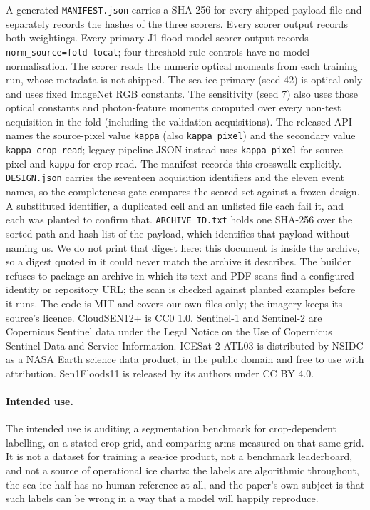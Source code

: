 \documentclass[10pt,twocolumn,letterpaper]{article}
\begin{document}
A generated \texttt{MANIFEST.json} carries a SHA-256 for every shipped payload file
and separately records the hashes of the three scorers. Every scorer output records
both weightings. Every primary J1 flood model-scorer output records
\texttt{norm\_source=fold-local}; four threshold-rule controls have no model
normalisation. The scorer reads the numeric optical moments from each training run,
whose metadata is not shipped. The sea-ice primary (seed 42) is optical-only and
uses fixed ImageNet RGB constants. The sensitivity (seed 7) also uses those optical
constants and photon-feature moments computed over every non-test acquisition in the
fold (including the validation acquisitions). The released API names the
source-pixel value \texttt{kappa} (also \texttt{kappa\_pixel}) and the secondary
value \texttt{kappa\_crop\_read}; legacy pipeline JSON instead uses
\texttt{kappa\_pixel} for source-pixel and \texttt{kappa} for crop-read. The manifest
records this crosswalk explicitly.
\texttt{DESIGN.json} carries the seventeen acquisition identifiers
and the eleven event names, so the completeness gate compares the scored set
against a frozen design. A substituted
identifier, a duplicated cell and an unlisted file each fail it, and each was
planted to confirm that. \texttt{ARCHIVE\_ID.txt} holds one SHA-256 over the
sorted path-and-hash list of the payload, which identifies that payload without
naming us. We do not print that digest here: this document is inside the archive,
so a digest quoted in it could never match the archive it describes. The builder
refuses to package an archive in which its text and PDF scans find a configured
identity or repository URL; the scan is checked against planted examples before it
runs. The
code is MIT and covers our own files only; the imagery keeps its source's licence.
CloudSEN12+ is CC0 1.0. Sentinel-1 and Sentinel-2 are Copernicus Sentinel data
under the Legal Notice on the Use of Copernicus Sentinel Data and Service
Information. ICESat-2 ATL03 is distributed by NSIDC as a NASA Earth science data
product, in the public domain and free to use with attribution. Sen1Floods11 is
released by its authors under CC BY 4.0.

\paragraph{Intended use.} The intended use is auditing a
segmentation benchmark for crop-dependent labelling, on a stated crop grid, and
comparing arms measured on that same grid. It is not a dataset for training a
sea-ice product, not a benchmark leaderboard, and not a source of operational ice
charts: the labels are algorithmic throughout, the sea-ice half has no human
reference at all, and the paper's own subject is that such labels can be wrong in a
way that a model will happily reproduce.
\end{document}
